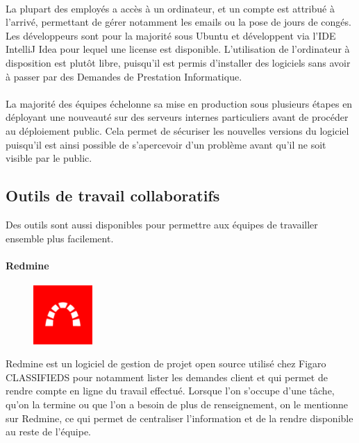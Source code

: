 \paragraph{}
La plupart des employés a accès à un ordinateur, et un compte est attribué à l'arrivé, permettant de gérer notamment les emails ou la pose de jours de congés.
Les développeurs sont pour la majorité sous Ubuntu et développent via l'IDE IntelliJ Idea pour lequel une license est disponible.
L'utilisation de l'ordinateur à disposition est plutôt libre, puisqu'il est permis d'installer des logiciels sans avoir à passer par des Demandes de Prestation Informatique.
\paragraph{}
La majorité des équipes échelonne sa mise en production sous plusieurs étapes en déployant une nouveauté sur des serveurs internes particuliers avant de procéder au déploiement public.
Cela permet de sécuriser les nouvelles versions du logiciel puisqu'il est ainsi possible de s'apercevoir d'un problème avant qu'il ne soit visible par le public.

\subsection{Outils de travail collaboratifs}
\label{subs:Outils de travail collaboratifs}
Des outils sont aussi disponibles pour permettre aux équipes de travailler ensemble plus facilement.
\paragraph{Redmine}
\label{par:Redmine}
\begin{figure}
  \begin{center}
    \includegraphics[width=0.20\textwidth]{Pictures/redmine_logo.png}
  \end{center}
\end{figure}
Redmine est un logiciel de gestion de projet open source utilisé chez Figaro CLASSIFIEDS pour notamment lister les demandes client et qui permet de rendre compte en ligne du travail effectué.
Lorsque l'on s'occupe d'une tâche, qu'on la termine ou que l'on a besoin de plus de renseignement, on le mentionne sur Redmine, ce qui permet de centraliser l'information et de la rendre disponible au reste de l'équipe.
